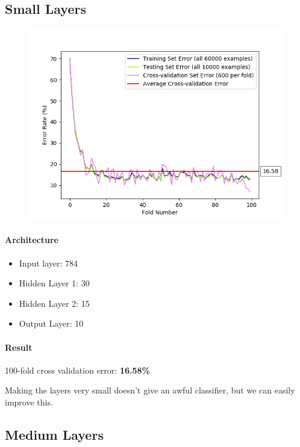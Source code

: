 \documentclass[11pt]{article}
\makeatletter
\def\maxwidth{\ifdim\Gin@nat@width>\linewidth\linewidth
    \else\Gin@nat@width\fi}
\let\Oldincludegraphics\includegraphics
\renewcommand{\includegraphics}[1]{\Oldincludegraphics[width=.8\maxwidth]{#1}}
\providecommand{\tightlist}{%
      \setlength{\itemsep}{0pt}\setlength{\parskip}{0pt}}
\makeatother
\begin{document}
\subsection{Small Layers}\label{small-layers}

\begin{figure}[htbp]
\centering
\includegraphics{plots/ff-layersize-30-15.png}
\end{figure}

\paragraph{Architecture}\label{architecture}

\begin{itemize}
\tightlist
\item
  Input layer: 784
\item
  Hidden Layer 1: 30
\item
  Hidden Layer 2: 15
\item
  Output Layer: 10
\end{itemize}

\paragraph{Result}\label{result}

100-fold cross validation error: \textbf{16.58\%}

Making the layers very small doesn't give an awful classifier, but we
can easily improve this.

\pagebreak

\subsection{Medium Layers}\label{medium-layers}
\end{document}
